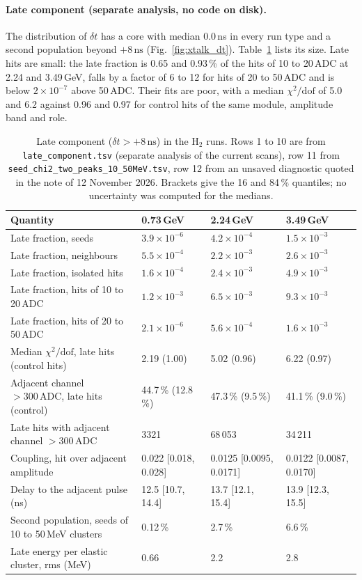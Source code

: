 \documentclass[11pt]{article}
\newcommand{\ns}{\,\mathrm{ns}}
\newcommand{\adc}{\,\mathrm{ADC}}
\newcommand{\code}[1]{\texttt{#1}}
\begin{document}
\paragraph{Late component (separate analysis, no code on disk).} The distribution of $\delta t$ has a core with median 0.0\,ns in every run type and a second population beyond $+8\ns$ (Fig.~\ref{fig:xtalk_dt}). Table~\ref{tab:xtalk} lists its size. Late hits are small: the late fraction is 0.65 and 0.93\,\% of the hits of 10 to 20\,ADC at 2.24 and 3.49\,GeV, falls by a factor of 6 to 12 for hits of 20 to 50\,ADC and is below $2 \times 10^{-7}$ above 50\,ADC. Their fits are poor, with a median $\chi^2/\mathrm{dof}$ of 5.0 and 6.2 against 0.96 and 0.97 for control hits of the same module, amplitude band and role.

\begin{table}[htbp]
\centering
\caption{Late component ($\delta t > +8\ns$) in the H$_2$ runs. Rows 1 to 10 are from \code{late\_component.tsv} (separate analysis of the current scans), row 11 from \code{seed\_chi2\_two\_peaks\_10\_50MeV.tsv}, row 12 from an unsaved diagnostic quoted in the note of 12 November 2026. Brackets give the 16 and 84\,\% quantiles; no uncertainty was computed for the medians.}
\label{tab:xtalk}
\small
\begin{tabular}{llll}
\toprule
Quantity & 0.73\,GeV & 2.24\,GeV & 3.49\,GeV \\
\midrule
Late fraction, seeds & $3.9 \times 10^{-6}$ & $4.2 \times 10^{-4}$ & $1.5 \times 10^{-3}$ \\
Late fraction, neighbours & $5.5 \times 10^{-4}$ & $2.2 \times 10^{-3}$ & $2.6 \times 10^{-3}$ \\
Late fraction, isolated hits & $1.6 \times 10^{-4}$ & $2.4 \times 10^{-3}$ & $4.9 \times 10^{-3}$ \\
Late fraction, hits of 10 to 20\,ADC & $1.2 \times 10^{-3}$ & $6.5 \times 10^{-3}$ & $9.3 \times 10^{-3}$ \\
Late fraction, hits of 20 to 50\,ADC & $2.1 \times 10^{-6}$ & $5.6 \times 10^{-4}$ & $1.6 \times 10^{-3}$ \\
Median $\chi^2/\mathrm{dof}$, late hits (control hits) & 2.19 (1.00) & 5.02 (0.96) & 6.22 (0.97) \\
Adjacent channel $> 300\adc$, late hits (control) & 44.7\,\% (12.8\,\%) & 47.3\,\% (9.5\,\%) & 41.1\,\% (9.0\,\%) \\
Late hits with adjacent channel $> 300\adc$ & 3321 & 68\,053 & 34\,211 \\
Coupling, hit over adjacent amplitude & 0.022 [0.018, 0.028] & 0.0125 [0.0095, 0.0171] & 0.0122 [0.0087, 0.0170] \\
Delay to the adjacent pulse (ns) & 12.5 [10.7, 14.4] & 13.7 [12.1, 15.4] & 13.9 [12.3, 15.5] \\
Second population, seeds of 10 to 50\,MeV clusters & 0.12\,\% & 2.7\,\% & 6.6\,\% \\
Late energy per elastic cluster, rms (MeV) & 0.66 & 2.2 & 2.8 \\
\bottomrule
\end{tabular}
\end{table}
\end{document}
